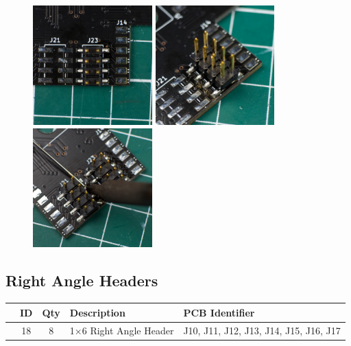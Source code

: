 \documentclass[12pt, a4paper]{article}
\newcommand{\checkbox}[1]{\CheckBox[backgroundcolor=0.86 0.828 0.71, name=#1]{}}
\begin{document}
\begin{figure}[H]
    \centering
    \includegraphics[width=46mm]{images/section_2-1_single.jpg}
    \hspace{2mm}
    \includegraphics[width=46mm]{images/section_2-1_full.jpg}
    \hspace{2mm}
    \includegraphics[width=46mm]{images/section_2-1_top.jpg}
\end{figure}

\subsection{Right Angle Headers}

\begin{center}
    \small
    \setlength\extrarowheight{8pt}
    \begin{tabularx}{\textwidth}{|c|c|c|X|l|}
        \hline\rowcolor{lightgray} & ID & Qty & Description & PCB Identifier\\
        \hline\checkbox{ga} & 18 & 8 & 1×6 Right Angle Header & J10, J11, J12, J13, J14, J15, J16, J17\\
        \hline
    \end{tabularx}
\end{center}
\end{document}
